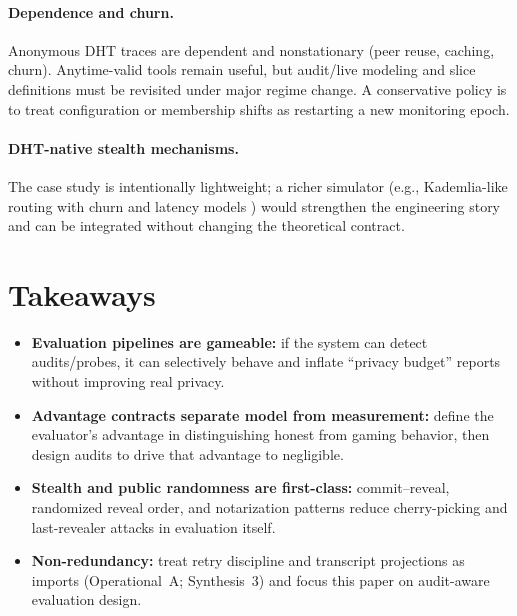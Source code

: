\documentclass[11pt]{article}
\begin{document}
\paragraph{Dependence and churn.}
Anonymous DHT traces are dependent and nonstationary (peer reuse, caching, churn).
Anytime-valid tools remain useful, but audit/live modeling and slice definitions must be revisited under major regime change.
A conservative policy is to treat configuration or membership shifts as restarting a new monitoring epoch.

\paragraph{DHT-native stealth mechanisms.}
The case study is intentionally lightweight; a richer simulator (e.g., Kademlia-like routing with churn and latency models \cite{maymounkov2002kademlia})
would strengthen the engineering story and can be integrated without changing the theoretical contract.

\section{Takeaways}
\begin{itemize}[leftmargin=*]
\item \textbf{Evaluation pipelines are gameable:} if the system can detect audits/probes, it can selectively behave and inflate ``privacy budget'' reports without improving real privacy.
\item \textbf{Advantage contracts separate model from measurement:} define the evaluator's advantage in distinguishing honest from gaming behavior, then design audits to drive that advantage to negligible.
\item \textbf{Stealth and public randomness are first-class:} commit--reveal, randomized reveal order, and notarization patterns reduce cherry-picking and last-revealer attacks in evaluation itself.
\item \textbf{Non-redundancy:} treat retry discipline and transcript projections as imports (Operational~A; Synthesis~3) and focus this paper on audit-aware evaluation design.
\end{itemize}
\end{document}
